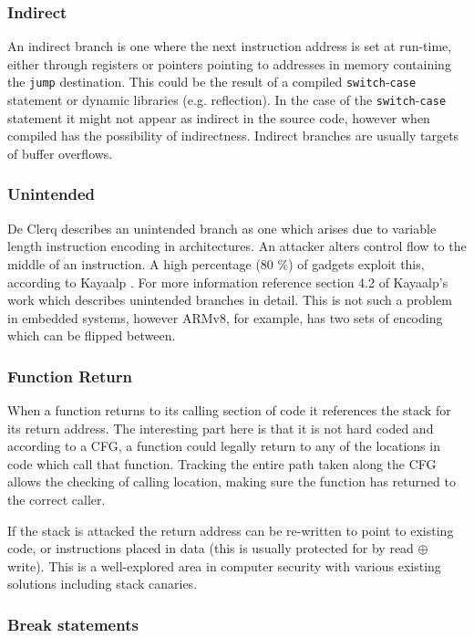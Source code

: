 \subsubsection{Indirect}
An indirect branch is one where the next instruction address is set at run-time, either through registers or pointers pointing to addresses in memory containing the \verb|jump| destination. This could be the result of a compiled \verb|switch|-\verb|case| statement or dynamic libraries (e.g. reflection). In the case of the \verb|switch|-\verb|case| statement it might not appear as indirect in the source code, however when compiled has the possibility of indirectness. Indirect branches are usually targets of buffer overflows.

\subsubsection{Unintended}
De Clerq \cite{DeClercq2017} describes an unintended branch as one which arises due to variable length instruction encoding in architectures. An attacker alters control flow to the middle of an instruction. A high percentage (80 \%) of gadgets exploit this, according to Kayaalp \cite{Kayaalp2014}. For more information reference section 4.2 of Kayaalp’s work \cite{Kayaalp2014} which describes unintended branches in detail. This is not such a problem in embedded systems, however ARMv8, for example, has two sets of encoding which can be flipped between.

\subsubsection{Function Return}
When a function returns to its calling section of code it references the stack for its return address. The interesting part here is that it is not hard coded and according to a CFG, a function could legally return to any of the locations in code which call that function. Tracking the entire path taken along the CFG allows the checking of calling location, making sure the function has returned to the correct caller.

If the stack is attacked the return address can be re-written to point to existing code, or instructions placed in data (this is usually protected for by read $\oplus$ write). This is a well-explored area in computer security with various existing solutions including stack canaries.

\ifnotesincluded

\subsubsection{Break statements}

